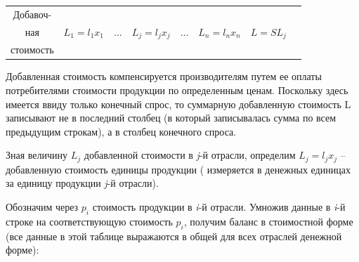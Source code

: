 \documentclass[12pt, 4paper]{book}
\begin{document}
{\begin{table}[h]
\begin{tabular}[center]{|p{0.2in}|p{0.2in}|p{1in}|p{0.2in}|p{1in}|p{0.2in}|p{1in}|p{0.3in}|p{0.3in}|}
	\multicolumn{2}{|c|}{{\tiny Добавоч-}}  & \multicolumn{1}{c|}{} & \multicolumn{1}{c|}{} & \multicolumn{1}{c|}{} & \multicolumn{1}{c|}{} & \multicolumn{1}{c|}{}& \multicolumn{1}{c|}{} & \multicolumn{1}{c|}{}\\  
	\multicolumn{2}{|c|}{{\tiny ная}}  & \multicolumn{1}{c|}{$L_1 = l_1x_1$} & \multicolumn{1}{c|}{...} & \multicolumn{1}{c|}{$L_j = l_jx_j$} & \multicolumn{1}{c|}{...} & \multicolumn{1}{c|}{$L_n = l_nx_n$}& \multicolumn{1}{c|}{$L = SL_j$} & \multicolumn{1}{c|}{}\\ 
	\multicolumn{2}{|c|}{{\tiny стоимость}}  & \multicolumn{1}{c|}{} & \multicolumn{1}{c|}{} & \multicolumn{1}{c|}{} & \multicolumn{1}{c|}{} & \multicolumn{1}{c|}{}& \multicolumn{1}{c|}{} & \multicolumn{1}{c|}{}\\ \hline
	\end{tabular}
\end{table}
\par

Добавленная стоимость компенсируется производителям путем ее оплаты потребителями стоимости продукции по определенным ценам. Поскольку здесь имеется ввиду только конечный спрос, то суммарную добавленную стоимость L записывают не в последний столбец (в который записывалась сумма по всем предыдущим строкам), а в столбец конечного спроса.
\par

Зная величину $L_j$ добавленной стоимости в \textit{j}-й отрасли, определим $L_j = l_jx_j$ – добавленную стоимость единицы продукции ( измеряется в денежных единицах за единицу продукции \textit{j}-й отрасли).
\par

Обозначим через $ p_i $ стоимость продукции в \textit{i}-й отрасли. Умножив данные в \textit{i}-й строке на соответствующую стоимость $ p_i $, получим баланс в стоимостной форме (все данные в этой таблице выражаются в общей для всех отраслей денежной форме):

}
\end{document}
